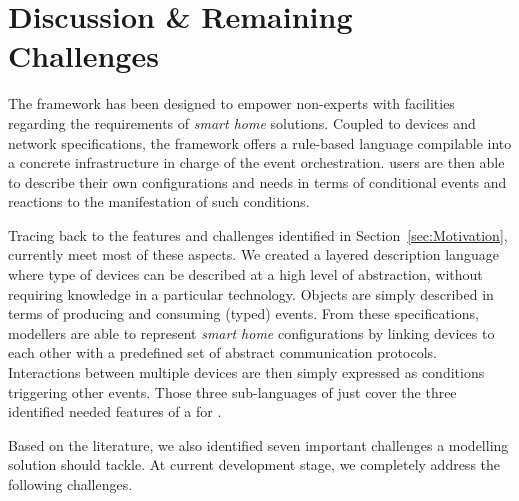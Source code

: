 \section{Discussion \& Remaining Challenges}
\label{sec:Discussion}

The \IOTDSL framework has been designed to empower non-experts with facilities regarding the requirements of \textit{smart home} \IOT solutions. Coupled to \IOT devices and network specifications, the framework offers a rule-based language compilable into a concrete \CEP infrastructure in charge of the event orchestration. \IOTDSL users are then able to describe their own configurations and needs in terms of conditional events and reactions to the manifestation of such conditions.

Tracing back to the features and challenges identified in Section~\ref{sec:Motivation}, \IOTDSL currently meet most of these aspects. We created a layered description language where type of devices can be described at a high level of abstraction, without requiring knowledge in a particular technology. Objects are simply described in terms of producing and consuming (typed) events. From these specifications, modellers are able to represent \textit{smart home} configurations by linking devices to each other with a predefined set of abstract communication protocols. Interactions between multiple devices are then simply  expressed as conditions triggering other events. Those three sub-languages of \IOTDSL just cover the three identified needed features of a \DSL for \IOT.

Based on the literature, we also identified seven important challenges a \IOT modelling solution should tackle. At current development stage, we completely address the following challenges.

